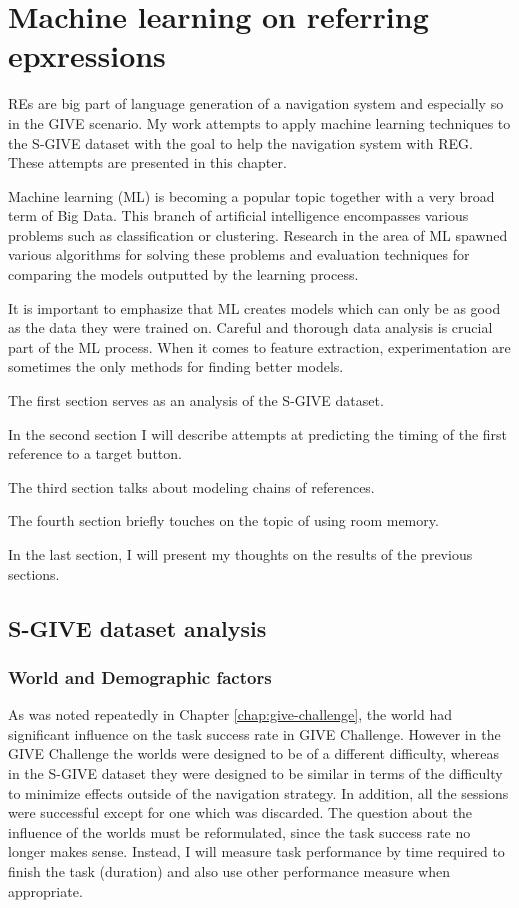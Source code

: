 \chapter{Machine learning on referring epxressions}
\label{chap:ml}
REs are big part of language generation of a navigation system and especially so in the GIVE scenario. My work attempts to apply machine learning techniques to the S-GIVE dataset with the goal to help the navigation system with REG. These attempts are presented in this chapter.

Machine learning (ML) is becoming a popular topic together with a very broad term of Big Data. This branch of artificial intelligence encompasses various problems such as classification or clustering. Research in the area of ML spawned various algorithms for solving these problems and evaluation techniques for comparing the models outputted by the learning process. 

It is important to emphasize that ML creates models which can only be as good as the data they were trained on. Careful and thorough data analysis is crucial part of the ML process. When it comes to feature extraction, experimentation are sometimes the only methods for finding better models. 

The first section serves as an analysis of the S-GIVE dataset.

In the second section I will describe attempts at predicting the timing of the first reference to a target button. 

The third section talks about modeling chains of references. 

The fourth section briefly touches on the topic of using room memory. 

In the last section, I will present my thoughts on the results of the previous sections.

\section{S-GIVE dataset analysis}

\subsection{World and Demographic factors}
\label{subsec:world-demo-factors}
As was noted repeatedly in Chapter \ref{chap:give-challenge}, the world had significant influence on the task success rate in GIVE Challenge. However in the GIVE Challenge the worlds were designed to be of a different difficulty, whereas in the S-GIVE dataset they were designed to be similar in terms of the difficulty to minimize effects outside of the navigation strategy. In addition, all the sessions were successful except for one which was discarded. The question about the influence of the worlds must be reformulated, since the task success rate no longer makes sense. Instead, I will measure task performance by time required to finish the task (duration) and also use other performance measure when appropriate.

